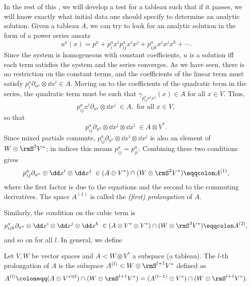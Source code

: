 In the rest of this \subsect, we will develop a test for a tableau such that if it passes, we will know exactly what initial data one should specify to determine an analytic solution. Given a tableau $A$, we can try to look for an analytic solution in the form of a power series ansatz
\[u^a(x)=p^a+p^a_i x^i p^a_{ij}x^ix^j+p^a_{ijk}x^ix^jx^k+\cdots.\]
Since the system is homogeneous with constant coefficients, $u$ is a solution iff each term satisfies the system and the series converges. As we have seen, there is no restriction on the constant terms, and the coefficients of the linear term must satisfy $p^a_i\partial_{u^a}\otimes \dd x^i\in A$. Moving on to the coefficients of the quadratic term in the series, the quadratic term must be such that $\gamma_{p^a_{ij}x^ix^j}(x)\in A$ for all $x\in V$. Thus,
\[p^a_{ij}x^i\partial_{u^a}\otimes \dd x^j \; \in A,\text{ for all }x\in V, \]
so that 
\[p^a_{ij}\partial_{u^a}\otimes \dd x^j\otimes \dd x^i \;\in A\otimes V^\ast.\]
Since mixed partials commute, $p^a_{ij}\partial_{u^a}\otimes \dd x^i\otimes \dd x^j$ is also an element of $W\otimes \rmS^2 V^\ast$; in indices this means $p^a_{ij}=p^a_{ji}$. Combining these two conditions gives 
\[p^a_{ij}\partial_{u^a}\otimes \dd x^i\otimes \dd x^j \; \in (A\otimes V^\ast)\cap (W\otimes \rmS^2 V^\ast)\eqqcolon A^{(1)},\]
where the first factor is due to the equations and the second to the commuting derivatives. The space $A^{(1)}$ is called the \emph{(first) prolongation} of $A$.

Similarly, the condition on the cubic term is 
\[p^a_{ijk}\partial_{u^a}\otimes \dd x^i\otimes\dd x^j\otimes\dd x^k\; \in(A\otimes V^\ast\otimes V^\ast)\cap (W\otimes \rmS^3 V^\ast)\eqqcolon A^{(2)},\]
and so on for all $l$. In general, we define 

\begin{defn}[Prolongation]
    Let $V,W$ be vector spaces and $A<W\otimes V^\ast$ a subspace (a tableau). The $l$-th prolongation of $A$ is the subspace $A^{(l)}<W\otimes \rmS^{l+1}V^\ast$ defined as
    \[A^{(l)}\coloneqq (A\otimes V^{\ast\otimes l})\cap (W\otimes \rmS^{l+1} V^\ast)=(A^{(l-1)}\otimes V^\ast)\cap (W\otimes \rmS^{l+1} V^\ast).\]
\end{defn}

